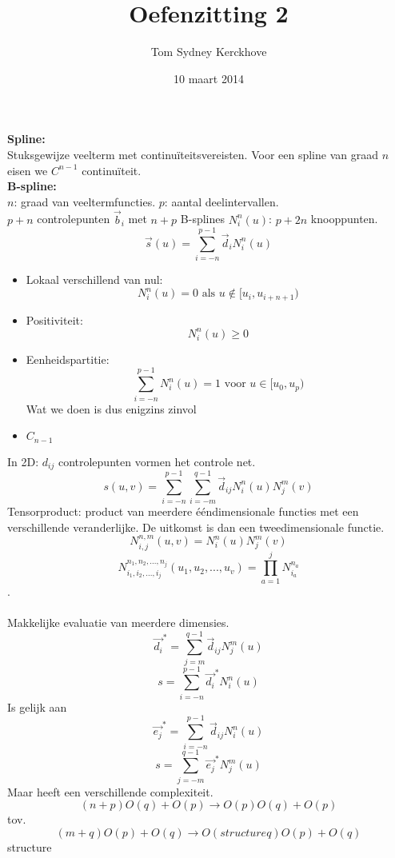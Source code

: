 \documentclass[10pt,a4paper]{article}
\title{Oefenzitting 2}
\author{Tom Sydney Kerckhove}
\date{10 maart 2014}
\begin{document}
\maketitle

\noindent\textbf{Spline:}\\
Stuksgewijze veelterm met continu\"iteitsvereisten. Voor een spline van graad $n$ eisen we $C^{n-1}$ continu\"iteit.\\
\noindent\textbf{B-spline:}\\
$n$: graad van veeltermfuncties. $p$: aantal deelintervallen.\\
$p+n$ controlepunten $\vec{b}_i$ met $n+p$ B-splines $N_{i}^{n}(u)$:
$p+2n$ knooppunten.
\[
\vec{s}(u) = \sum_{i=-n}^{p-1}\vec{d}_iN_{i}^{n}(u)
\]

\begin{itemize}
\item Lokaal verschillend van nul:
\[
N_{i}^{n}(u) = 0 \text{ als } u \not\in [u_i, u_{i+n+1})
\]

\item Positiviteit:
\[
N_{i}^{n}(u) \ge 0
\]

\item Eenheidspartitie:
\[
\sum_{i=-n}^{p-1}N_{i}^{n}(u) = 1 \text{ voor } u\in [u_0,u_p)
\]
Wat we doen is dus enigzins zinvol

\item $C_{n-1}$

\end{itemize}

In 2D: $d_{ij}$ controlepunten vormen het controle net.
\[
s(u,v) = \sum_{i=-n}^{p-1}\sum_{i=-m}^{q-1}\vec{d}_{ij}N_{i}^{n}(u)N_{j}^{m}(v)
\]
Tensorproduct: product van meerdere \'e\'endimensionale functies met een verschillende veranderlijke. De uitkomst is dan een tweedimensionale functie.
\[
N_{i,j}^{n,m}(u,v) = N_{i}^{n}(u)N_{j}^{m}(v)
\]
\[
N^{n_1,n_2,...,n_j}_{i_1,i_2,...,i_j}(u_1,u_2,...,u_v) = \prod_{a=1}^jN_{i_a}^{n_a}
\]
.\\\\
Makkelijke evaluatie van meerdere dimensies.
\[
\vec{d_i}^* = \sum_{j=m}^{q-1}\vec{d}_{ij}N_{j}^{m}(u)
\]
\[
s = \sum_{i=-n}^{p-1} \vec{d_{i}}^*N_{i}^{n}(u)
\]
Is gelijk aan
\[
\vec{e_j}^* = \sum_{i=-n}^{p-1}\vec{d}_{ij}N_{i}^{n}(u)
\]
\[
s = \sum_{j=-m}^{q-1} \vec{e_{j}}^*N_{j}^{m}(u)
\]
Maar heeft een verschillende complexiteit.
\[
(n+p)O(q) + O(p) \rightarrow O(p)O(q) + O(p)
\]
tov.
\[
(m+q)O(p) + O(q) \rightarrow O(structureq)O(p) + O(q)
\]structure
\end{document}
